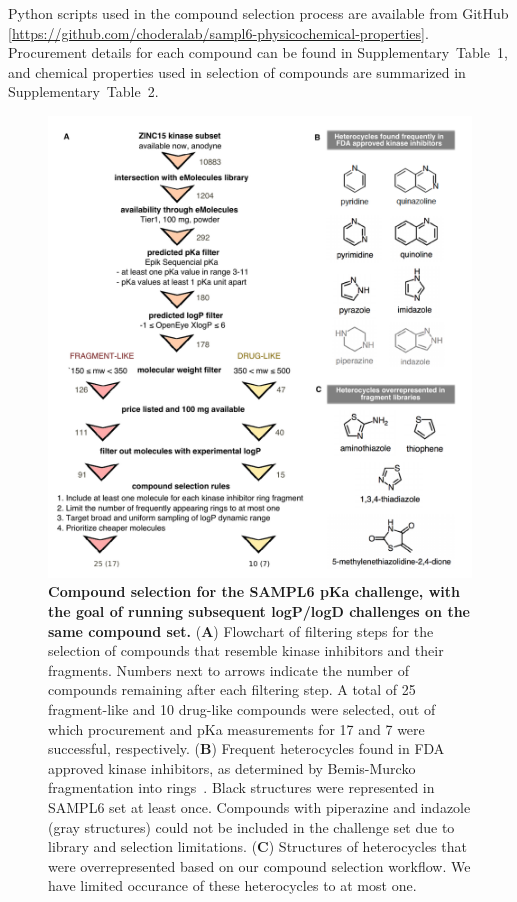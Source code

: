 \documentclass[9pt,lineno]{elife}
\begin{document}
Python scripts used in the compound selection process are available from GitHub [\url{https://github.com/choderalab/sampl6-physicochemical-properties}]. Procurement details for each compound can be found in Supplementary~Table~1, and chemical properties used in selection of compounds are summarized in Supplementary~Table~2.

\begin{figure}
\begin{center}
\includegraphics[width=0.95\linewidth]{figures/compound_selection_figure.pdf}
\caption{{\bf Compound selection for the SAMPL6 pKa challenge, with the goal of running subsequent logP/logD challenges on the same compound set.} 
(\textbf{A}) Flowchart of filtering steps for the selection of compounds that resemble kinase inhibitors and their fragments. 
Numbers next to arrows indicate the number of compounds remaining after each filtering step. 
A total of 25 fragment-like and 10 drug-like compounds were selected, out of which procurement and pKa measurements for 17 and 7 were successful, respectively. 
(\textbf{B}) Frequent heterocycles found in FDA approved kinase inhibitors, as determined by Bemis-Murcko fragmentation into rings~\citep{bemis_properties_1996}. 
Black structures were represented in SAMPL6 set at least once. 
Compounds with piperazine and indazole (gray structures) could not be included in the challenge set due to library and selection limitations.  
(\textbf{C}) Structures of heterocycles that were overrepresented based on our compound selection workflow. We have limited occurance of these heterocycles to at most one.
}
\label{fig:compound_selection_figure}
\end{center}
\end{figure}
\end{document}
